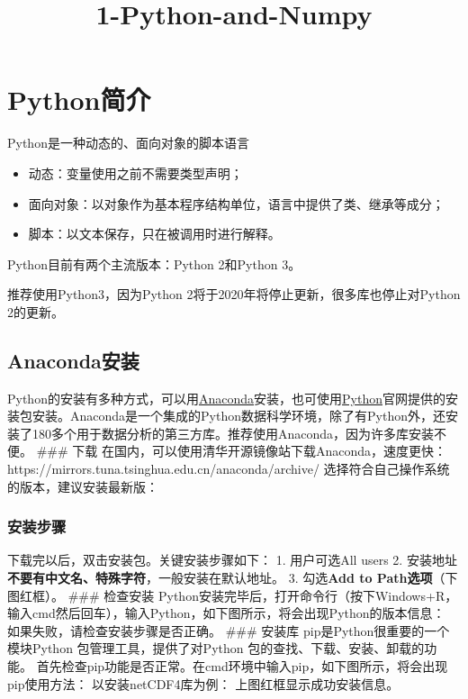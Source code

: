 \documentclass[11pt]{article}
\title{1-Python-and-Numpy}
\begin{document}
    
    
    \maketitle
    
    

    
    \section{Python简介}\label{pythonux7b80ux4ecb}

Python是一种动态的、面向对象的脚本语言

\begin{itemize}
\item
  动态：变量使用之前不需要类型声明；
\item
  面向对象：以对象作为基本程序结构单位，语言中提供了类、继承等成分；
\item
  脚本：以文本保存，只在被调用时进行解释。
\end{itemize}

Python目前有两个主流版本：Python 2和Python 3。

推荐使用Python3，因为Python 2将于2020年将停止更新，很多库也停止对Python
2的更新。

    \subsection{Anaconda安装}\label{anacondaux5b89ux88c5}

Python的安装有多种方式，可以用\href{https://www.anaconda.com/}{Anaconda}安装，也可使用\href{https://www.python.org/}{Python}官网提供的安装包安装。Anaconda是一个集成的Python数据科学环境，除了有Python外，还安装了180多个用于数据分析的第三方库。推荐使用Anaconda，因为许多库安装不便。
\#\#\# 下载
在国内，可以使用清华开源镜像站下载Anaconda，速度更快：https://mirrors.tuna.tsinghua.edu.cn/anaconda/archive/
选择符合自己操作系统的版本，建议安装最新版：

\subsubsection{安装步骤}\label{ux5b89ux88c5ux6b65ux9aa4}

下载完以后，双击安装包。关键安装步骤如下： 1. 用户可选All users 2.
安装地址\textbf{不要有中文名、特殊字符}，一般安装在默认地址。 3.
勾选\textbf{Add to Path选项}（下图红框）。 \#\#\# 检查安装
Python安装完毕后，打开命令行（按下Windows+R，输入cmd然后回车），输入Python，如下图所示，将会出现Python的版本信息：
如果失败，请检查安装步骤是否正确。 \#\#\# 安装库
pip是Python很重要的一个模块Python 包管理工具，提供了对Python
包的查找、下载、安装、卸载的功能。
首先检查pip功能是否正常。在cmd环境中输入pip，如下图所示，将会出现pip使用方法：
以安装netCDF4库为例： 上图红框显示成功安装信息。
\end{document}
